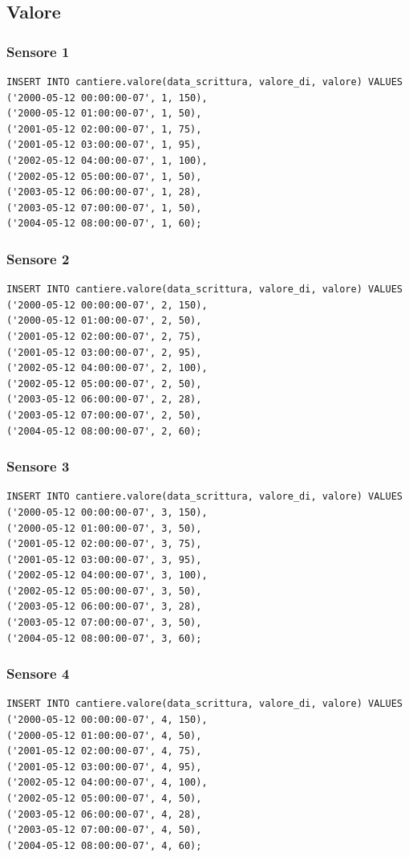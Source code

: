 \documentclass[11pt]{article}
\begin{document}
\subsection*{Valore}
\label{sec:org2904ba6}
\subsubsection*{Sensore 1}
\label{sec:orgb555013}
\begin{verbatim}
INSERT INTO cantiere.valore(data_scrittura, valore_di, valore) VALUES
('2000-05-12 00:00:00-07', 1, 150),
('2000-05-12 01:00:00-07', 1, 50),
('2001-05-12 02:00:00-07', 1, 75),
('2001-05-12 03:00:00-07', 1, 95),
('2002-05-12 04:00:00-07', 1, 100),
('2002-05-12 05:00:00-07', 1, 50),
('2003-05-12 06:00:00-07', 1, 28),
('2003-05-12 07:00:00-07', 1, 50),
('2004-05-12 08:00:00-07', 1, 60);
\end{verbatim}
\subsubsection*{Sensore 2}
\label{sec:org6199ade}
\begin{verbatim}
INSERT INTO cantiere.valore(data_scrittura, valore_di, valore) VALUES
('2000-05-12 00:00:00-07', 2, 150),
('2000-05-12 01:00:00-07', 2, 50),
('2001-05-12 02:00:00-07', 2, 75),
('2001-05-12 03:00:00-07', 2, 95),
('2002-05-12 04:00:00-07', 2, 100),
('2002-05-12 05:00:00-07', 2, 50),
('2003-05-12 06:00:00-07', 2, 28),
('2003-05-12 07:00:00-07', 2, 50),
('2004-05-12 08:00:00-07', 2, 60);
\end{verbatim}
\subsubsection*{Sensore 3}
\label{sec:orgf3a34b3}
\begin{verbatim}
INSERT INTO cantiere.valore(data_scrittura, valore_di, valore) VALUES
('2000-05-12 00:00:00-07', 3, 150),
('2000-05-12 01:00:00-07', 3, 50),
('2001-05-12 02:00:00-07', 3, 75),
('2001-05-12 03:00:00-07', 3, 95),
('2002-05-12 04:00:00-07', 3, 100),
('2002-05-12 05:00:00-07', 3, 50),
('2003-05-12 06:00:00-07', 3, 28),
('2003-05-12 07:00:00-07', 3, 50),
('2004-05-12 08:00:00-07', 3, 60);
\end{verbatim}
\subsubsection*{Sensore 4}
\label{sec:org9d92b6f}
\begin{verbatim}
INSERT INTO cantiere.valore(data_scrittura, valore_di, valore) VALUES
('2000-05-12 00:00:00-07', 4, 150),
('2000-05-12 01:00:00-07', 4, 50),
('2001-05-12 02:00:00-07', 4, 75),
('2001-05-12 03:00:00-07', 4, 95),
('2002-05-12 04:00:00-07', 4, 100),
('2002-05-12 05:00:00-07', 4, 50),
('2003-05-12 06:00:00-07', 4, 28),
('2003-05-12 07:00:00-07', 4, 50),
('2004-05-12 08:00:00-07', 4, 60);
\end{verbatim}
\end{document}
